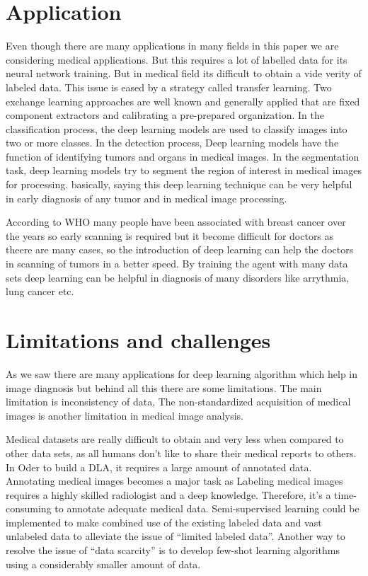 \documentclass{article,17 pt}
\begin{document}
 
\section*{Application }


Even though there are many applications in many fields in this paper we are considering medical applications. But this requires a lot of labelled data for its neural network training. But in medical field its difficult to obtain a vide verity of labeled data. This issue is eased by a strategy called transfer learning. Two exchange learning approaches are well known and generally applied that are fixed component extractors and calibrating a pre-prepared organization. In the classification process, the deep learning models are used to classify images into two or more classes. In the detection process, Deep learning models have the function of identifying tumors and organs in medical images. In the segmentation task, deep learning models try to segment the region of interest in medical images for processing. basically, saying this deep learning technique can be very helpful in early diagnosis of any tumor and in medical image processing. 

According to WHO many people have been associated with breast cancer over the years so early scanning is required but it become difficult for doctors as theere are many cases, so the introduction of deep learning can help the doctors in scanning of tumors in a better speed. By training the agent with many data sets deep learning can be helpful in diagnosis of many disorders like arrythmia, lung cancer etc. 


\section*{Limitations and challenges }



 As we saw there are many applications for deep learning algorithm which help in image diagnosis but behind all this there are some limitations. The main limitation is inconsistency of data, The non-standardized acquisition of medical images is another limitation in medical image analysis. 

Medical datasets are really difficult to obtain and very less when compared to other data sets, as all humans don’t like to share their medical reports to others. In Oder to build a DLA, it requires a large amount of annotated data. Annotating medical images becomes a major task as Labeling medical images requires a highly skilled radiologist and a deep knowledge. Therefore, it's a time-consuming to annotate adequate medical data. Semi-supervised learning could be implemented to make combined use of the existing labeled data and vast unlabeled data to alleviate the issue of “limited labeled data”. Another way to resolve the issue of “data scarcity” is to develop few-shot learning algorithms using a considerably smaller amount of data.
\end{document}
